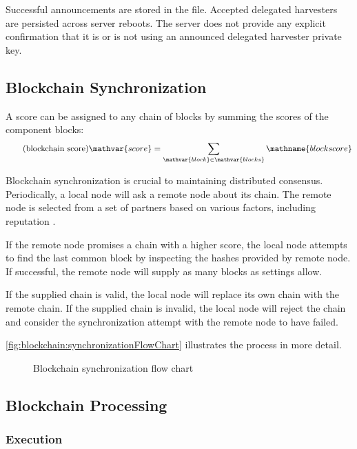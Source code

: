 Successful announcements are stored in the  file.
Accepted delegated harvesters are persisted across server reboots.
The server does not provide any explicit confirmation that it is or is not using an announced delegated harvester private key.

\subsection{Blockchain Synchronization}
\label{sec:blockchain:sync}

A score can be assigned to any chain of blocks by summing the scores of the component blocks:
\begin{equation}
	\tag{blockchain score} \mathvar{score} = \sum_{\mathvar{block} \in \mathvar{blocks}} \mathname{block score}
\end{equation}

Blockchain synchronization is crucial to maintaining distributed consensus.
Periodically, a local node will ask a remote node about its chain.
The remote node is selected from a set of partners based on various factors, including reputation .

If the remote node promises a chain with a higher score, the local node attempts to find the last common block by inspecting the hashes provided by remote node.
If successful, the remote node will supply as many blocks as settings allow.

If the supplied chain is valid, the local node will replace its own chain with the remote chain.
If the supplied chain is invalid, the local node will reject the chain and consider the synchronization attempt with the remote node to have failed.

\autoref{fig:blockchain:synchronizationFlowChart} illustrates the process in more detail.

\begin{figure}[H]
	\begin{center}
		
		\caption{Blockchain synchronization flow chart\label{fig:blockchain:synchronizationFlowChart}}
	\end{center}
\end{figure}

\subsection{Blockchain Processing}

\subsubsection*{Execution}

